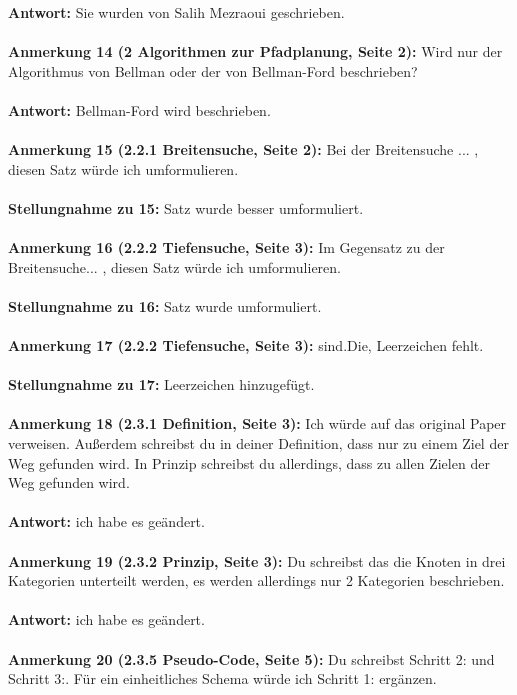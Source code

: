 \documentclass[a4paper,12pt]{book}
\begin{document}
\textbf{Antwort:} Sie wurden von Salih Mezraoui geschrieben.
\\ \\
\textbf{Anmerkung 14 (2 Algorithmen zur Pfadplanung, Seite 2):}
Wird nur der Algorithmus von Bellman oder der von Bellman-Ford beschrieben?
 \\  \\
\textbf{Antwort:} Bellman-Ford wird beschrieben.
\\ \\
\textbf{Anmerkung 15 (2.2.1 Breitensuche, Seite 2):}
\grqq Bei der Breitensuche ... \glqq, diesen Satz würde ich umformulieren.
\\ \\
\textbf{Stellungnahme zu 15:}
Satz wurde besser umformuliert.
\\ \\
\textbf{Anmerkung 16 (2.2.2 Tiefensuche, Seite 3):}
\grqq Im Gegensatz zu der Breitensuche... \glqq, diesen Satz würde ich umformulieren.
\\ \\
\textbf{Stellungnahme zu 16:}
Satz wurde umformuliert.
\\ \\
\textbf{Anmerkung 17 (2.2.2 Tiefensuche, Seite 3):}
\grqq sind.Die\grqq, Leerzeichen fehlt.
\\ \\
\textbf{Stellungnahme zu 17:}
Leerzeichen hinzugefügt.
\\ \\
\textbf{Anmerkung 18 (2.3.1 Definition, Seite 3):}
Ich würde auf das original Paper verweisen. Außerdem schreibst du in deiner Definition, dass nur zu einem Ziel der Weg gefunden wird. In Prinzip schreibst du allerdings, dass zu allen Zielen der Weg gefunden wird. 
 \\  \\
\textbf{Antwort:} ich habe es geändert.
\\ \\
\textbf{Anmerkung 19 (2.3.2 Prinzip, Seite 3):}
Du schreibst das die Knoten in drei Kategorien unterteilt werden, es werden allerdings nur 2 Kategorien beschrieben.
 \\  \\
\textbf{Antwort:} ich habe es geändert.
\\ \\
\textbf{Anmerkung 20 (2.3.5 Pseudo-Code, Seite 5):}
Du schreibst Schritt 2: und Schritt 3:. Für ein einheitliches Schema würde ich Schritt 1: ergänzen.
 \\  \\
\end{document}
